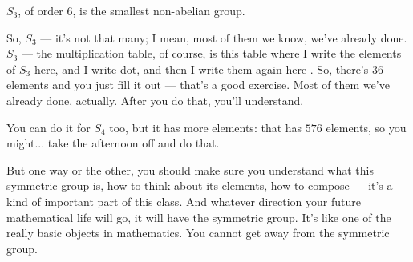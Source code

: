 \begin{aiNote}
$S_3$, of order $6$, is the smallest non-abelian group.
\end{aiNote}

\begin{speech}[01:15:45 - 01:17:00]
So, $S_3$ --- it's not that many; I mean, most of them we know, we've already done. $S_3$ --- the multiplication table, of course, is this table where I write the elements of $S_3$ here, and I write dot, and then I write them again here . So, there's $36$ elements and you just fill it out --- that's a good exercise. Most of them we've already done, actually. After you do that, you'll understand.

You can do it for $S_4$ too, but it has more elements: that has $576$ elements, so you might...  take the afternoon off and do that.

But one way or the other, you should make sure you understand what this symmetric group is, how to think about its elements, how to compose --- it's a kind of important part of this class. And whatever direction your future mathematical life will go, it will have the symmetric group. It's like one of the really basic objects in mathematics. You cannot get away from the symmetric group.
\end{speech}

